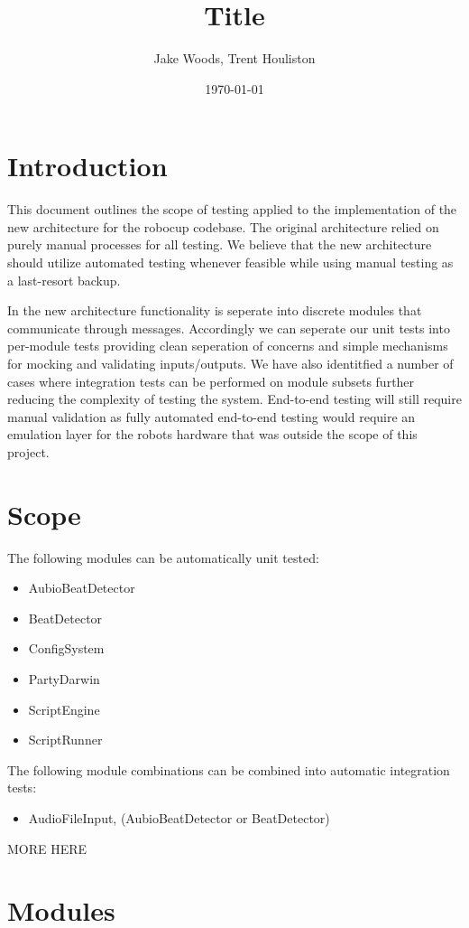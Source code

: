 \documentclass[a4paper]{article}
\title{Title}
\author{Jake Woods, Trent Houliston}
\date{\today}
\begin{document}
\maketitle

\section{Introduction}
	This document outlines the scope of testing applied to the implementation of the new architecture for the robocup codebase. 
	The original architecture relied on purely manual processes for all testing. 
	We believe that the new architecture should utilize automated testing whenever feasible while using manual testing as a last-resort backup.
	
	In the new architecture functionality is seperate into discrete modules that communicate through messages. 
	Accordingly we can seperate our unit tests into per-module tests providing clean seperation of concerns and simple mechanisms for mocking and validating inputs/outputs.
	We have also identitfied a number of cases where integration tests can be performed on module subsets further reducing the complexity of testing the system.
	End-to-end testing will still require manual validation as fully automated end-to-end testing would require an emulation layer for the robots hardware that was outside the scope of this project.

\section{Scope}
	The following modules can be automatically unit tested:
	\begin{itemize}
		\item AubioBeatDetector
		\item BeatDetector
		\item ConfigSystem
		\item PartyDarwin
		\item ScriptEngine
		\item ScriptRunner
	\end{itemize}

	The following module combinations can be combined into automatic integration tests:
	\begin{itemize}
		\item AudioFileInput, (AubioBeatDetector or BeatDetector)
	\end{itemize}

	MORE HERE

\section{Modules}
\end{document}
